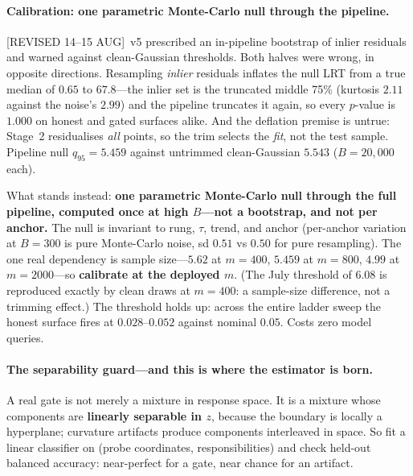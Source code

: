 \documentclass[11pt]{article}
\newcommand{\provtag}[2]{{\footnotesize\sffamily\textcolor{#1}{[#2]}}}
\newcommand{\REVI}{\provtag{openamber}{REVISED 14--15 AUG}}
\begin{document}
\paragraph{Calibration: one parametric Monte-Carlo null through the pipeline.} \REVI\ v5
prescribed an in-pipeline bootstrap of inlier residuals and warned against clean-Gaussian
thresholds. Both halves were wrong, in opposite directions. Resampling \emph{inlier} residuals
inflates the null LRT from a true median of $0.65$ to $\mathbf{67.8}$---the inlier set is the
truncated middle 75\% (kurtosis $2.11$ against the noise's $2.99$) and the pipeline truncates it
again, so every $p$-value is $1.000$ on honest and gated surfaces alike. And the deflation
premise is untrue: Stage~2 residualises \emph{all} points, so the trim selects the \emph{fit},
not the test sample. Pipeline null $q_{95} = \mathbf{5.459}$ against untrimmed clean-Gaussian
$5.543$ ($B = 20{,}000$ each).

What stands instead: \textbf{one parametric Monte-Carlo null through the full pipeline, computed
once at high $B$---not a bootstrap, and not per anchor.} The null is invariant to rung, $\tau$,
trend, and anchor (per-anchor variation at $B = 300$ is pure Monte-Carlo noise, sd $0.51$ vs
$0.50$ for pure resampling). The one real dependency is sample size---$5.62$ at $m = 400$,
$5.459$ at $m = 800$, $4.99$ at $m = 2000$---so \textbf{calibrate at the deployed $m$}. (The
July threshold of $6.08$ is reproduced exactly by clean draws at $m = 400$: a sample-size
difference, not a trimming effect.) The threshold holds up: across the entire ladder sweep the
honest surface fires at $0.028$--$0.052$ against nominal $0.05$. Costs zero model queries.

\paragraph{The separability guard---and this is where the estimator is born.} A real gate is not
merely a mixture in response space. It is a mixture whose components are \textbf{linearly
separable in $z$}, because the boundary is locally a hyperplane; curvature artifacts produce
components interleaved in space. So fit a linear classifier on (probe coordinates,
responsibilities) and check held-out balanced accuracy: near-perfect for a gate, near chance for
an artifact.
\end{document}
